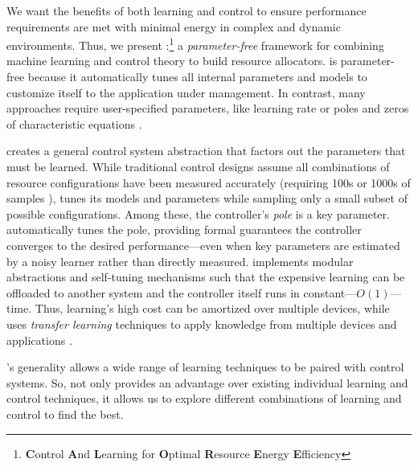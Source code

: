 We want the benefits of both learning and control to ensure
performance requirements are met with minimal energy in complex and
dynamic environments.  Thus, we present
\SYSTEM{}:\footnote{\textbf{C}ontrol \textbf{A}nd \textbf{L}earning
  for \textbf{O}ptimal \textbf{R}esource \textbf{E}nergy
  \textbf{E}fficiency} a \emph{parameter-free} framework for combining
machine learning and control theory to build resource allocators.
\SYSTEM{} is parameter-free because it automatically tunes all
internal parameters and models to customize itself to the application
under management.  In contrast, many approaches require user-specified
parameters, like learning rate \cite{dubach2010,more} or poles and
zeros of characteristic equations \cite{ControlWare,more}.

\SYSTEM{} creates a general control system abstraction that factors
out the parameters that must be learned.  While traditional control
designs assume all combinations of resource configurations have been
measured accurately (requiring 100s or 1000s of samples
\cite{sysid,FSE2015}), \SYSTEM{} tunes its models and parameters while
sampling only a small subset of possible configurations.  Among these,
the controller's \emph{pole} is a key parameter.  \SYSTEM{}
automatically tunes the pole, providing formal guarantees the
controller converges to the desired performance---even when key
parameters are estimated by a noisy learner rather than directly
measured.  \SYSTEM{} implements modular abstractions and self-tuning
mechanisms such that the expensive learning can be offloaded to
another system and the controller itself runs in
constant---$O(1)$---time.  Thus, learning's high cost can be amortized
over multiple devices, while \SYSTEM{} uses \emph{transfer learning}
techniques to apply knowledge from multiple devices and applications
\cite{transferlearning}.


\SYSTEM{}'s generality allows a wide range of learning techniques to
be paired with control systems.  So, \SYSTEM{} not only provides an
advantage over existing individual learning and control techniques, it
allows us to explore different combinations of learning and control to
find the best.

